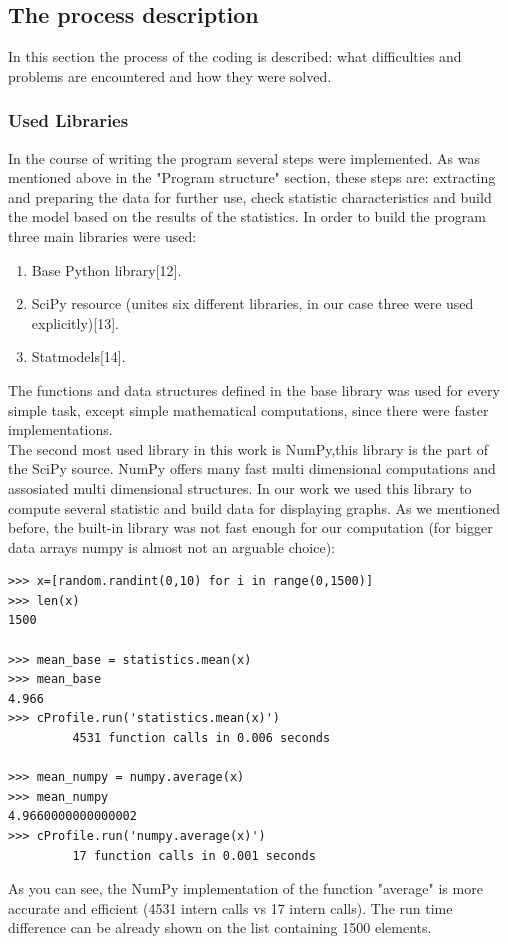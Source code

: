\documentclass{article}
\begin{document}
\subsection{The process description}
In this section the process of the coding is described: what difficulties and problems are encountered and how they were solved.
\subsubsection{Used Libraries}
In the course of writing the program several steps were implemented. As was mentioned above in the "Program structure" section, these steps are: extracting and preparing the data for further use, check statistic characteristics and build the model based on the results of the statistics. In order to build the program three main libraries were used:
\begin{enumerate}
    \item Base Python library[12].
    \item SciPy resource (unites six different libraries, in our case three were used explicitly)[13].
    \item Statmodels[14].
\end{enumerate}
The functions and data structures defined in the base library was used for every simple task, except simple mathematical computations, since there were faster implementations.\\
The second most used library in this work is NumPy,this library is the part of the SciPy source. NumPy offers many fast multi dimensional computations and assosiated multi dimensional structures. In our work we used this library to compute several statistic and build data for displaying graphs. As we mentioned before, the built-in library was not fast enough for our computation (for bigger data arrays numpy is almost not an arguable choice):
\begin{verbatim}
>>> x=[random.randint(0,10) for i in range(0,1500)]
>>> len(x)
1500

>>> mean_base = statistics.mean(x)
>>> mean_base
4.966
>>> cProfile.run('statistics.mean(x)')   
         4531 function calls in 0.006 seconds
        
>>> mean_numpy = numpy.average(x)
>>> mean_numpy
4.9660000000000002
>>> cProfile.run('numpy.average(x)')
         17 function calls in 0.001 seconds
\end{verbatim}   
As you can see, the NumPy implementation of the function "average" is more accurate and efficient (4531 intern calls vs 17 intern calls). The run time difference can be already shown on the list containing 1500 elements.\\
\end{document}
